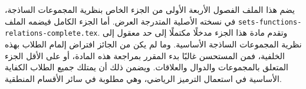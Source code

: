 \documentclass[../../include/open-logic-part]{subfiles}
\begin{document}

\begin{editorial}
  يضم هذا الملف الفصول الأربعة الأولى من الجزء الخاص بنظرية المجموعات
  الساذجة، في نسخته الأصلية المتدرجة العرض. أما الجزء الكامل فيضمه
  الملف \verb|sets-functions-relations-complete.tex|. وتقدم مادة هذا
  الجزء مدخلًا مكتملًا إلى حد معقول إلى نظرية المجموعات الساذجة الأساسية.
  وما لم يكن من الجائز افتراض إلمام الطلاب بهذه الخلفية، فمن المستحسن
  غالبًا بدء المقرر بمراجعة هذه المادة، أو على الأقل الجزء المتعلق
  بالمجموعات والدوال والعلاقات. ويضمن ذلك أن يمتلك جميع الطلاب الكفاية
  الأساسية في استعمال الترميز الرياضي، وهي مطلوبة في سائر الأقسام
  المنطقية.
\end{editorial}





\OLEndPartHook
\end{document}
